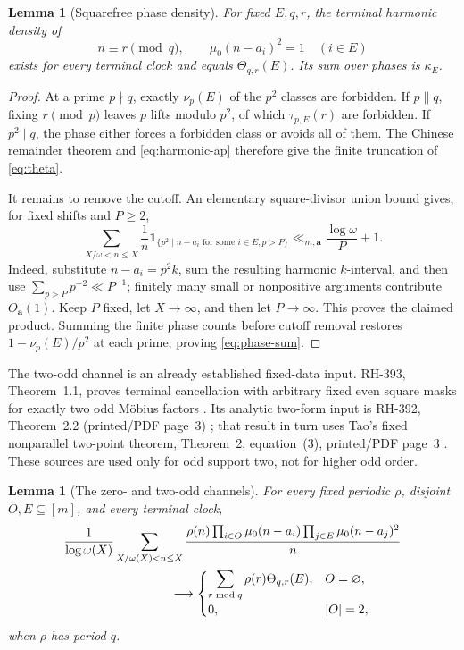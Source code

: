\documentclass[11pt]{article}
\newtheorem{lemma}[theorem]{Lemma}
\theoremstyle{definition}
\theoremstyle{remark}
\newcommand{\mob}{\mu}
\newcommand{\ind}{\mathbf 1}
\begin{document}
\begin{lemma}[Squarefree phase density]
\label{lem:density}
For fixed \(E,q,r\), the terminal harmonic density of
\[
 n\equiv r\pmod q,\qquad \mob_0(n-a_i)^2=1\quad(i\in E)
\]
exists for every terminal clock and equals \(\Theta_{q,r}(E)\).  Its sum
over phases is \(\kappa_E\).
\end{lemma}

\begin{proof}
At a prime \(p\nmid q\), exactly \(\nu_p(E)\) of the \(p^2\) classes are
forbidden.  If \(p\parallel q\), fixing \(r\pmod p\) leaves \(p\) lifts
modulo \(p^2\), of which \(\tau_{p,E}(r)\) are forbidden.  If
\(p^2\mid q\), the phase either forces a forbidden class or avoids all of
them.  The Chinese remainder theorem and \eqref{eq:harmonic-ap} therefore
give the finite truncation of \eqref{eq:theta}.

It remains to remove the cutoff.  An elementary square-divisor union bound
gives, for fixed shifts and \(P\geq2\),
\begin{equation}
 \sum_{X/\omega<n\leq X}\frac1n
 \ind_{\{p^2\mid n-a_i\text{ for some }i\in E, p>P\}}
 \ll_{m,\mathbf a}\frac{\log\omega}{P}+1.
 \label{eq:tail}
\end{equation}
Indeed, substitute \(n-a_i=p^2k\), sum the resulting harmonic
\(k\)-interval, and then use \(\sum_{p>P}p^{-2}\ll P^{-1}\); finitely many
small or nonpositive arguments contribute \(O_{\mathbf a}(1)\).  Keep
\(P\) fixed, let \(X\to\infty\), and then let \(P\to\infty\).  This proves
the claimed product.  Summing the finite phase counts before cutoff removal
restores \(1-\nu_p(E)/p^2\) at each prime, proving
\eqref{eq:phase-sum}.
\end{proof}

The two-odd channel is an already established fixed-data input.  RH-393,
Theorem~1.1, proves terminal cancellation with arbitrary fixed even square
masks for exactly two odd M\"obius factors \cite{RH393}.  Its analytic
two-form input is RH-392, Theorem~2.2 (printed/PDF page~3)
\cite{RH392}; that result in turn uses Tao's fixed nonparallel two-point
theorem, Theorem~2, equation~(3), printed/PDF page~3
\cite{Tao2016LogChowla}.  These sources are used only for odd support two,
not for higher odd order.

\begin{lemma}[The zero- and two-odd channels]
\label{lem:old-channels}
For every fixed periodic \(\rho\), disjoint \(O,E\subseteq[m]\), and
every terminal clock,
\begin{align}
 &\frac1{\log\omega(X)}\sum_{X/\omega(X)<n\leq X}
 \frac{\rho(n)\prod_{i\in O}\mob_0(n-a_i)
 \prod_{j\in E}\mob_0(n-a_j)^2}{n}
 \notag\\
 &\hspace{30mm}\longrightarrow
 \begin{cases}
  \displaystyle\sum_{r\bmod q}\rho(r)\Theta_{q,r}(E),&O=\varnothing,\\
  0,&|O|=2,
 \end{cases}
 \label{eq:old-channels}
\end{align}
when \(\rho\) has period \(q\).
\end{lemma}
\end{document}

